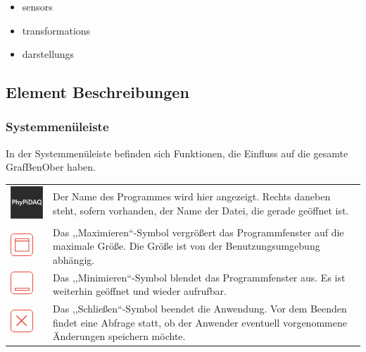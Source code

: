 \documentclass[parskip=full]{scrartcl}
\begin{document}
\begin{itemize}
	\item \glspl{sensor}
	\item \glspl{transformation}
	\item \glspl{darstellung}
\end{itemize}

\subsection{Element Beschreibungen}

\subsubsection{Systemmenüleiste}

In der Systemmenüleiste befinden sich Funktionen, die Einfluss auf die gesamte \gls{GrafBenOber} haben.

\begin{tabular}[t]{p{1cm} p{10cm}} %
	\vspace{0cm}\includegraphics[width = 1 cm]{Grafik/PhyPiDAQ.png} & Der Name des Programmes wird hier angezeigt. Rechts daneben steht, sofern vorhanden, der Name der Datei, die gerade geöffnet ist.\newline\\
	\vspace{0cm}\includegraphics[width = 1 cm]{Grafik/Maximieren.png} & Das ,,Maximieren``-Symbol vergrößert das Programmfenster auf die maximale Größe. Die Größe ist von der Benutzungsumgebung abhängig.\newline\\
	\vspace{0cm}\includegraphics[width = 1 cm]{Grafik/Minimieren.png} & Das ,,Minimieren``-Symbol blendet das Programmfenster aus. Es ist weiterhin geöffnet und wieder aufrufbar. \\
	\vspace{0cm}\includegraphics[width = 1 cm]{Grafik/Schliessen.png} & Das ,,Schließen``-Symbol beendet die Anwendung. Vor dem Beenden findet eine Abfrage statt, ob der Anwender eventuell vorgenommene Änderungen speichern möchte.\\
\end{tabular}
\end{document}
